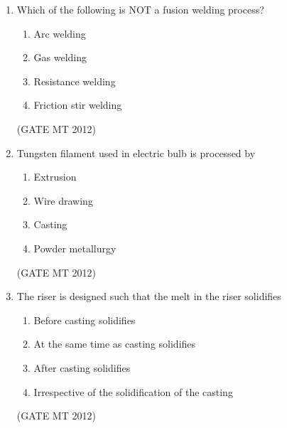 \documentclass[journal, 11pt, onecolumn]{IEEEtran}
\theoremstyle{remark}
\begin{document}
\begin{enumerate}
\begin{multicols}{2}
\begin{enumerate}  
\item \( E_c = (1-f)E_m + f E_f \)
\item \( E_c = fE_m + (1-f)E_f \)
\item \( \frac{1}{E_c} = \frac{(1-f)}{E_m} + \frac{f}{E_f} \)
\item \( \frac{1}{E_c} = \frac{f}{E_m} + \frac{(1-f)}{E_f} \)
\end{enumerate}
\end{multicols}
\hfill(GATE MT 2012)

\item Which of the following is NOT a fusion welding process?

\begin{multicols}{2}
\begin{enumerate}  
\item Arc welding
\item Gas welding
\item Resistance welding
\item Friction stir welding
\end{enumerate}
\end{multicols}
\hfill(GATE MT 2012)

\item Tungsten filament used in electric bulb is processed by

\begin{multicols}{2}
\begin{enumerate}  
\item Extrusion
\item Wire drawing
\item Casting
\item Powder metallurgy
\end{enumerate}
\end{multicols}
\hfill(GATE MT 2012)

\item The riser is designed such that the melt in the riser solidifies

\begin{enumerate}  
\item Before casting solidifies
\item At the same time as casting solidifies
\item After casting solidifies
\item Irrespective of the solidification of the casting
\end{enumerate}
\hfill(GATE MT 2012)



\end{enumerate}
\end{document}
